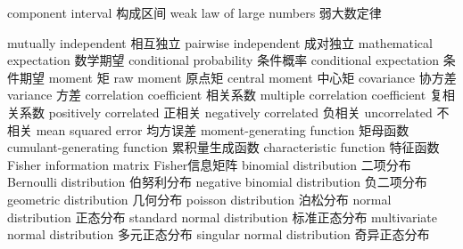 {component interval} 
{构成区间}
{weak law of large numbers} 
{弱大数定律}


{mutually independent} 
{相互独立}
{pairwise independent} 
{成对独立}
{mathematical expectation} 
{数学期望}
{conditional probability} 
{条件概率}
{conditional expectation} 
{条件期望}
{moment} 
{矩}
{raw moment} 
{原点矩}
{central moment} 
{中心矩}
{covariance} 
{协方差}
{variance} 
{方差}
{correlation coefficient} 
{相关系数}
{multiple correlation coefficient} 
{复相关系数}
{positively correlated} 
{正相关}
{negatively correlated} 
{负相关}
{uncorrelated} 
{不相关}
{mean squared error} 
{均方误差}
{moment-generating function} 
{矩母函数}
{cumulant-generating function} 
{累积量生成函数}
{characteristic function} 
{特征函数}
{Fisher information matrix} 
{Fisher信息矩阵}
{binomial distribution} 
{二项分布}
{Bernoulli distribution} 
{伯努利分布}
{negative binomial distribution} 
{负二项分布}
{geometric distribution} 
{几何分布}
{poisson distribution} 
{泊松分布}
{normal distribution} 
{正态分布}
{standard normal distribution} 
{标准正态分布}
{multivariate normal distribution} 
{多元正态分布}
{singular normal distribution} 
{奇异正态分布}

